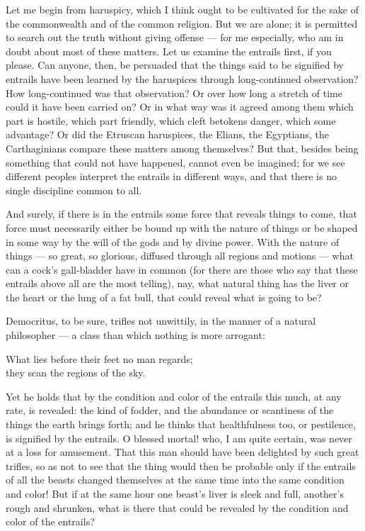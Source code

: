  Let me begin from haruspicy, which I think ought to be cultivated for the sake of the commonwealth and of the common religion. But we are alone; it is permitted to search out the truth without giving offense — for me especially, who am in doubt about most of these matters. Let us examine the entrails first, if you please. Can anyone, then, be persuaded that the things said to be signified by entrails have been learned by the haruspices through long-continued observation? How long-continued was that observation? Or over how long a stretch of time could it have been carried on? Or in what way was it agreed among them which part is hostile, which part friendly, which cleft betokens danger, which some advantage? Or did the Etruscan haruspices, the Elians, the Egyptians, the Carthaginians compare these matters among themselves? But that, besides being something that could not have happened, cannot even be imagined; for we see different peoples interpret the entrails in different ways, and that there is no single discipline common to all.

 And surely, if there is in the entrails some force that reveals things to come, that force must necessarily either be bound up with the nature of things or be shaped in some way by the will of the gods and by divine power. With the nature of things — so great, so glorious, diffused through all regions and motions — what can a cock's gall-bladder have in common (for there are those who say that these entrails above all are the most telling), nay, what natural thing has the liver or the heart or the lung of a fat bull, that could reveal what is going to be?

 Democritus, to be sure, trifles not unwittily, in the manner of a natural philosopher — a class than which nothing is more arrogant:

What lies before their feet no man regards; \\
they scan the regions of the sky.

Yet he holds that by the condition and color of the entrails this much, at any rate, is revealed: the kind of fodder, and the abundance or scantiness of the things the earth brings forth; and he thinks that healthfulness too, or pestilence, is signified by the entrails. O blessed mortal! who, I am quite certain, was never at a loss for amusement. That this man should have been delighted by such great trifles, so as not to see that the thing would then be probable only if the entrails of all the beasts changed themselves at the same time into the same condition and color! But if at the same hour one beast's liver is sleek and full, another's rough and shrunken, what is there that could be revealed by the condition and color of the entrails?

